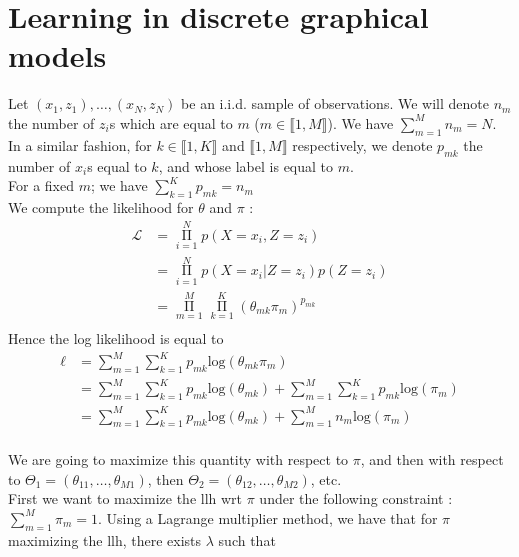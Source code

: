 \documentclass[11pt,a4paper]{article}
\begin{document}
\section{Learning in discrete graphical models}

Let $(x_1, z_1), \ldots, (x_N, z_N)$ be an i.i.d. sample of observations. We will denote $n_m$ the number of $z_i$s which are equal to $m$ ($m \in \llbracket 1, M \rrbracket$). We have $\sum\limits_{m=1}^{M} n_m = N$.
%
\\In a similar fashion, for $k \in \llbracket 1, K \rrbracket$ and $\llbracket 1, M \rrbracket$ respectively, we denote $p_{mk}$ the number of $x_i$s equal to $k$, and whose label is equal to $m$. 
\\For a fixed $m$; we have $\sum\limits_{k=1}^{K}  p_{mk} = n_m$
\\We compute the likelihood for $\theta$ and $\pi$ : 
$$\begin{aligned} \mathcal{L} &= \mathop{\Pi}\limits_{i=1}^N p(X = x_i, Z = z_i) \\
 &= \mathop{\Pi}\limits_{i=1}^N p(X=x_i | Z= z_i) p(Z=z_i)\\
 & = \mathop{\Pi}\limits_{m=1}^M  \mathop{\Pi}\limits_{k=1}^K (\theta_{m k} \pi_m)^{p_{mk}} \\
  \end{aligned}$$
Hence the log likelihood is equal to
 $$\begin{aligned} \ell & = \sum\limits_{m=1}^M  \sum\limits_{k=1}^K p_{mk} \mathrm{log}(\theta_{m k} \pi_m) \\
 &= \sum\limits_{m=1}^M  \sum\limits_{k=1}^K p_{mk} \mathrm{log}(\theta_{m k})  +  \sum\limits_{m=1}^M  \sum\limits_{k=1}^K p_{mk} \mathrm{log}(\pi_m) \\
&= \sum\limits_{m=1}^M  \sum\limits_{k=1}^K p_{mk} \mathrm{log}(\theta_{m k})  +  \sum\limits_{m=1}^M  n_m \mathrm{log}(\pi_m) 
 \end{aligned}$$
 \\We are going to maximize this quantity with respect to $\pi$, and then with respect to $\Theta_1 = (\theta_{11}, \ldots, \theta_{M1})$, then $\Theta_2 = (\theta_{12}, \ldots, \theta_{M2})$, etc.
 \\[5mm]First we want to maximize the llh wrt $\pi$ under the following constraint : $\sum\limits_{m=1}^{M} \pi_m = 1$. Using a Lagrange multiplier method, we have that for $\pi$ maximizing the llh, there exists $\lambda$ such that 
\end{document}
